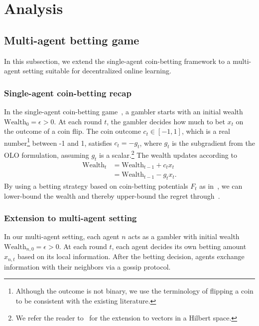 \documentclass[journal]{IEEEtran} %
\newcommand{\w}{\text{Wealth}}
\begin{document}
\section{Analysis}\label{sec:analysis}

\subsection{Multi-agent betting game}

In this subsection, we extend the single-agent coin-betting framework to a multi-agent setting suitable for decentralized online learning.

\subsubsection*{Single-agent coin-betting recap}

In the single-agent coin-betting game~\cite{orabona_coin_2016}, a gambler starts with an initial wealth $\w_0 = \epsilon > 0$.
At each round $t$, the gambler decides how much to bet $x_t$ on the outcome of a coin flip.
The coin outcome $c_t \in [-1,1]$, which is a real number\footnote{Although the outcome is not binary, we use the terminology of flipping a coin to be consistent with the existing literature.} between -1 and 1, satisfies $c_t = -g_t$, where $g_t$ is the subgradient from the OLO formulation, assuming $g_t$ is a scalar.\footnote{We refer the reader to~\cite{orabona_coin_2016} for the extension to vectors in a Hilbert space.}
The wealth updates according to
\begin{align}
    \w_t & = \w_{t-1} + c_t x_t  \\
         & = \w_{t-1} - g_t x_t.
\end{align}
By using a betting strategy based on coin-betting potentials $F_t$ as in~, we can lower-bound the wealth and thereby upper-bound the regret through~.

\subsubsection*{Extension to multi-agent setting}

In our multi-agent setting, each agent $n$ acts as a gambler with initial wealth $\w_{n,0} = \epsilon > 0$.
At each round $t$, each agent decides its own betting amount $x_{n,t}$ based on its local information.
After the betting decision, agents exchange information with their neighbors via a gossip protocol.
\end{document}
